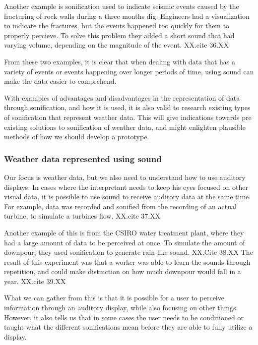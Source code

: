 Another example is sonification used to indicate seismic events caused by the fracturing of rock walls during a three months dig. Engineers had a visualization to indicate the fractures, but the events happened too quickly for them to properly percieve. To solve this problem they added a short sound that had varying volume, depending on the magnitude of the event. XX.cite 36.XX

From these two examples, it is clear that when dealing with data that has a variety of events or events happening over longer periods of time, using sound can make the data easier to comprehend.


With examples of advantages and disadvantages in the representation of data through sonification, and how it is used, it is also valid to research existing types of sonification that represent weather data. This will give indications towards pre existing solutions to sonification of weather data, and might enlighten plausible methods of how we should develop a prototype.


\subsubsection{Weather data represented using sound} %
\label{ssub:weather_data_represented_using_sound}

Our focus is weather data, but we also need to understand how to use auditory displays. In cases where the interpretant needs to keep his eyes focused on other visual data, it is possible to use sound to receive auditory data at the same time. For example, data was recorded and sonified from the recording of an actual turbine, to simulate a turbines flow. XX.cite 37.XX

Another example of this is from the CSIRO water treatment plant, where they had a large amount of data to be perceived at once. To simulate the amount of downpour, they used sonification to generate rain-like sound. XX.Cite 38.XX
The result of this experiment was that a worker was able to learn the sounds through repetition, and could make distinction on how much downpour would fall in a year. XX.cite 39.XX

What we can gather from this is that it is possible for a user to perceive information through an auditory display, while also focusing on other things. However, it also tells us that in some cases the user needs to be conditioned or taught what the different sonifications mean before they are able to fully utilize a display.

